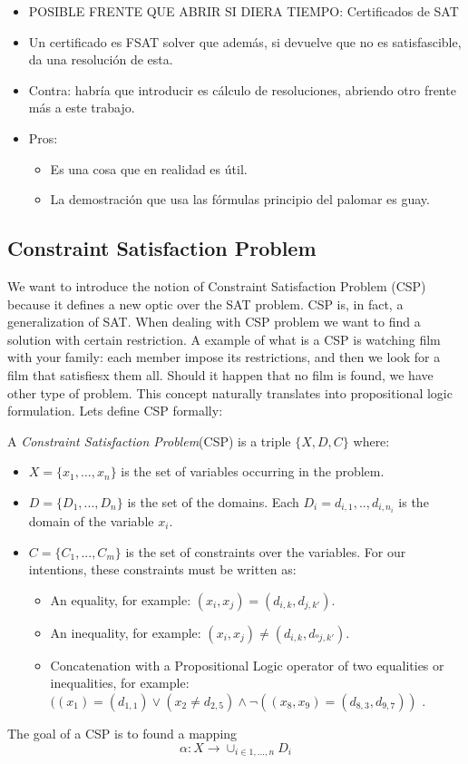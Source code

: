 \begin{itemize}
\item {\color{red}POSIBLE FRENTE QUE ABRIR SI DIERA TIEMPO: Certificados de SAT}
\item Un certificado es FSAT solver que además, si devuelve que no es satisfascible, da una resolución de esta.
\item Contra: habría que introducir es cálculo de resoluciones, abriendo otro frente más a este trabajo.
\item Pros:
  \begin{itemize}
  \item Es una cosa que en realidad es útil.
  \item La demostración que usa las fórmulas principio del palomar es guay.
  \end{itemize}
\end{itemize}
\subsection{Constraint Satisfaction Problem}
  
We want to introduce the notion of Constraint Satisfaction Problem (CSP) because it defines a new optic over the SAT problem. CSP is, in fact, a generalization of SAT. When dealing with CSP problem we want to find a solution with certain restriction. A example of what is a CSP is watching film with your family: each member impose its restrictions, and then we look for a film that satisfiesx them all. Should it happen that no film is found, we have other type of problem. This concept naturally translates into propositional logic formulation. Lets define CSP formally:

\begin{definition}
  A \emph{Constraint Satisfaction Problem}(CSP) is a triple $\{X,D,C\}$ where:
  \begin{itemize}
  \item $X=\{x_1,...,x_n\}$ is the set of variables  occurring in the problem.
  \item $D=\{D_1,...,D_n\}$ is the set of the domains. Each $D_i={d_{i,1},..,d_{i,n_i}}$ is the domain of the variable $x_i$.
  \item $C=\{C_1,...,C_m\}$ is the set of constraints over the variables. For our intentions, these constraints must be written as:
    \begin{itemize}
    \item An equality, for example: $(x_i, x_j) = (d_{i,k}, d_{j,k'})$.
    \item An inequality, for example: $(x_i, x_j) \ne (d_{i,k}, d_{ºj,k'})$.
    \item Concatenation with a Propositional Logic operator of two equalities or inequalities, for example: $((x_1) = (d_{1,1}) \vee (x_2 \ne d_{2,5}) \wedge \neg((x_8,x_9) = (d_{8,3},d_{9,7}))$ .
    \end{itemize}
  \end{itemize}
\end{definition}
  The goal of a CSP is to found a mapping \[ \alpha:X\to \cup_{i\in 1,...,n} D_i\]
  
